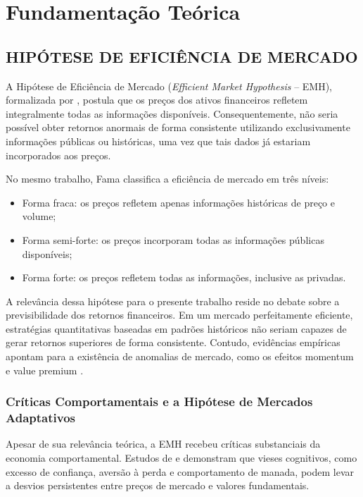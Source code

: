 \documentclass{eic-bcc-tcc}
\begin{document}
\chapter{Fundamentação Teórica}
\label{cha:fundamentacao}

\section{HIPÓTESE DE EFICIÊNCIA DE MERCADO}

A Hipótese de Eficiência de Mercado (\textit{Efficient Market Hypothesis} -- EMH), formalizada por \citep{Fama1970}, postula que os preços dos ativos financeiros refletem integralmente todas as informações disponíveis. Consequentemente, não seria possível obter retornos anormais de forma consistente utilizando exclusivamente informações públicas ou históricas, uma vez que tais dados já estariam incorporados aos preços.

No mesmo trabalho, Fama classifica a eficiência de mercado em três níveis:

\begin{itemize}
\item Forma fraca: os preços refletem apenas informações históricas de preço e volume;
\item Forma semi-forte: os preços incorporam todas as informações públicas disponíveis;
\item Forma forte: os preços refletem todas as informações, inclusive as privadas.
\end{itemize}

A relevância dessa hipótese para o presente trabalho reside no debate sobre a previsibilidade dos retornos financeiros. Em um mercado perfeitamente eficiente, estratégias quantitativas baseadas em padrões históricos não seriam capazes de gerar retornos superiores de forma consistente. Contudo, evidências empíricas apontam para a existência de anomalias de mercado, como os efeitos momentum e value premium \citep{FamaFrench1992, JegadeeshTitman1993}.

\subsection{Críticas Comportamentais e a Hipótese de Mercados Adaptativos}

Apesar de sua relevância teórica, a EMH recebeu críticas substanciais da economia comportamental. Estudos de \citep{Shiller2000} e \citep{Thaler1993} demonstram que vieses cognitivos, como excesso de confiança, aversão à perda e comportamento de manada, podem levar a desvios persistentes entre preços de mercado e valores fundamentais.
\end{document}
